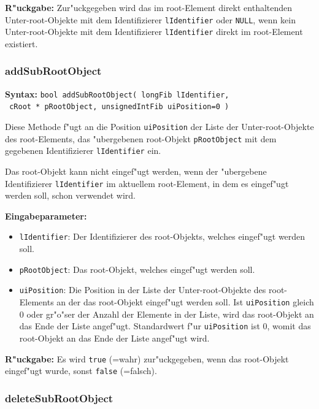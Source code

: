 \bigskip\noindent
\textbf{R"uckgabe:} Zur"uckgegeben wird das im root-Element direkt enthaltenden Unter-root-Objekte mit dem Identifizierer \verb|lIdentifier| oder \verb|NULL|, wenn kein Unter-root-Objekte mit dem Identifizierer \verb|lIdentifier| direkt im root-Element existiert.


\subsubsection{addSubRootObject}

\textbf{Syntax:} \verb|bool addSubRootObject( longFib lIdentifier,| \\\verb| cRoot * pRootObject, unsignedIntFib uiPosition=0 )|

\bigskip\noindent
Diese Methode f"ugt an die Position \verb|uiPosition| der Liste der Unter-root-Objekte des root-Elements, das "ubergebenen root-Objekt \verb|pRootObject| mit dem gegebenen Identifizierer \verb|lIdentifier| ein.

Das root-Objekt kann nicht eingef"ugt werden, wenn der "ubergebene Identifizierer \verb|lIdentifier| im aktuellem root-Element, in dem es eingef"ugt werden soll, schon verwendet wird.

\bigskip\noindent
\textbf{Eingabeparameter:}
\begin{itemize}
 \item \verb|lIdentifier|: Der Identifizierer des root-Objekts, welches eingef"ugt werden soll.
 \item \verb|pRootObject|: Das root-Objekt, welches eingef"ugt werden soll.
 \item \verb|uiPosition|: Die Position in der Liste der Unter-root-Objekte des root-Elements an der das root-Objekt eingef"ugt werden soll. Ist \verb|uiPosition| gleich $0$ oder gr"o"ser der Anzahl der Elemente in der Liste, wird das root-Objekt an das Ende der Liste angef"ugt. Standardwert f"ur \verb|uiPosition| ist $0$, womit das root-Objekt an das Ende der Liste angef"ugt wird.
\end{itemize}

\bigskip\noindent
\textbf{R"uckgabe:} Es wird \verb|true| (=wahr) zur"uckgegeben, wenn das root-Objekt eingef"ugt wurde, sonst \verb|false| (=falsch).


\subsubsection{deleteSubRootObject}

